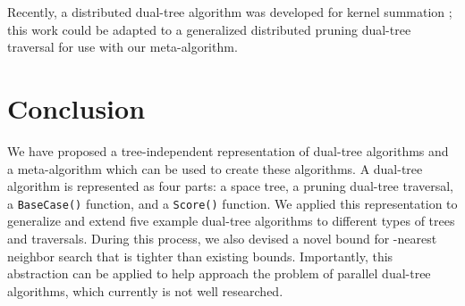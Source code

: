 \documentclass{article}
\begin{document}
\vspace*{-0.2em}
Recently, a distributed dual-tree algorithm was developed for
kernel summation \cite{lee2012distributed}; this work could be adapted to a
generalized distributed pruning dual-tree traversal for use with our
meta-algorithm.

\vspace*{-0.5em}
\section{Conclusion}


\vspace*{-0.2em}
We have proposed a tree-independent representation of dual-tree algorithms and a
meta-algorithm which can be used to create these algorithms.  A dual-tree
algorithm is represented as four parts: a space tree, a pruning dual-tree
traversal, a \texttt{BaseCase()} function, and a \texttt{Score()} function.  We
applied this representation to generalize and extend five example dual-tree
algorithms to different types of trees and traversals.  During this process, we
also devised a novel bound for -nearest neighbor search that is tighter than
existing bounds.  Importantly, this abstraction can be applied to help approach
the problem of parallel dual-tree algorithms, which currently is not well
researched.



\end{document}
